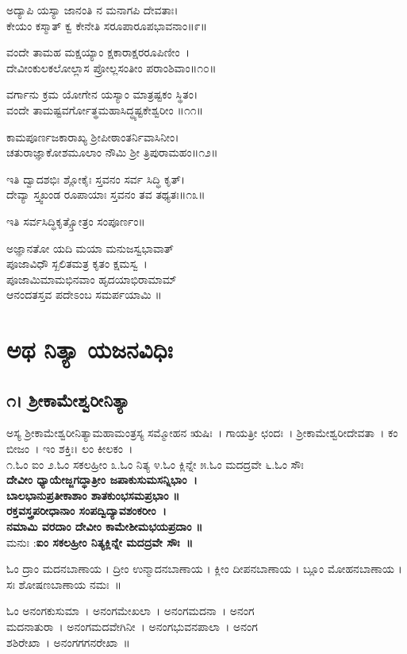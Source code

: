 ಅದ್ಯಾಪಿ ಯಸ್ಯಾ ಜಾನಂತಿ ನ ಮನಾಗಪಿ ದೇವತಾಃ।\\
ಕೇಯಂ ಕಸ್ಮಾತ್ ಕ್ವ ಕೇನೇತಿ ಸರೂಪಾರೂಪಭಾವನಾಂ॥೯॥

ವಂದೇ ತಾಮಹ ಮಕ್ಷಯ್ಯಾಂ ಕ್ಷಕಾರಾಕ್ಷರರೂಪಿಣೀಂ~।\\
ದೇವೀಂಕುಲಕಲೋಲ್ಲಾಸ ಪ್ರೋಲ್ಲಸಂತೀಂ ಪರಾಂಶಿವಾಂ॥೧೦॥

ವರ್ಗಾನು ಕ್ರಮ ಯೋಗೇನ ಯಸ್ಯಾಂ ಮಾತ್ರಷ್ಟಕಂ ಸ್ಥಿತಂ।\\
ವಂದೇ ತಾಮಷ್ಟವರ್ಗೋತ್ಥಮಹಾಸಿದ್ಧ್ಯಷ್ಟಕೇಶ್ವರೀಂ ॥೧೧॥

ಕಾಮಪೂರ್ಣಜಕಾರಾಖ್ಯ ಶ್ರೀಪೀಠಾಂತರ್ನಿವಾಸಿನೀಂ।\\
ಚತುರಾಜ್ಞಾಕೋಶಮೂಲಾಂ ನೌಮಿ ಶ್ರೀ ತ್ರಿಪುರಾಮಹಂ॥೧೨॥

ಇತಿ ದ್ವಾದಶಭಿಃ ಶ್ಲೋಕೈಃ ಸ್ತವನಂ ಸರ್ವ ಸಿದ್ಧಿ ಕೃತ್।\\
ದೇವ್ಯಾ ಸ್ತ್ವಖಂಡ ರೂಪಾಯಾಃ ಸ್ತವನಂ ತವ ತಥ್ಯತಃ॥೧೩॥
\begin{center}{\Large ಇತಿ ಸರ್ವಸಿದ್ಧಿಕೃತ್ಸ್ತೋತ್ರಂ ಸಂಪೂರ್ಣಂ॥}\end{center}
ಅಜ್ಞಾನತೋ ಯದಿ ಮಯಾ ಮನುಜಸ್ವಭಾವಾತ್\\ ಪೂಜಾವಿಧೌ ಸ್ಖಲಿತಮತ್ರ ಕೃತಂ ಕ್ಷಮಸ್ವ~।\\
ಪೂಜಾಮಿಮಾಮಭಿನವಾಂ ಹೃದಯಾಭಿರಾಮಾಮ್ \\ಆನಂದತಸ್ತವ ಪದೇಽಂಬ ಸಮರ್ಪಯಾಮಿ ॥
\chapter*{\center ಅಥ ನಿತ್ಯಾ ಯಜನವಿಧಿಃ}
\thispagestyle{empty}
\section{೧। ಶ್ರೀಕಾಮೇಶ್ವರೀನಿತ್ಯಾ}
ಅಸ್ಯ ಶ್ರೀಕಾಮೇಶ್ವರೀನಿತ್ಯಾಮಹಾಮಂತ್ರಸ್ಯ ಸಮ್ಮೋಹನ ಋಷಿಃ~। ಗಾಯತ್ರೀ ಛಂದಃ~। ಶ್ರೀಕಾಮೇಶ್ವರೀದೇವತಾ~। ಕಂ ಬೀಜಂ~। ಇಂ ಶಕ್ತಿಃ। ಲಂ ಕೀಲಕಂ~।\\
೧.ಓಂ ಐಂ ೨.ಓಂ ಸಕಲಹ್ರೀಂ ೩.ಓಂ ನಿತ್ಯ ೪.ಓಂ ಕ್ಲಿನ್ನೇ ೫.ಓಂ ಮದದ್ರವೇ ೬.ಓಂ ಸೌಃ \\
{\bfseries ದೇವೀಂ ಧ್ಯಾಯೇಜ್ಜಗದ್ಧಾತ್ರೀಂ ಜಪಾಕುಸುಮಸನ್ನಿಭಾಂ~।\\
ಬಾಲಭಾನುಪ್ರತೀಕಾಶಾಂ ಶಾತಕುಂಭಸಮಪ್ರಭಾಂ ॥\\
ರಕ್ತವಸ್ತ್ರಪರೀಧಾನಾಂ ಸಂಪದ್ವಿದ್ಯಾವಶಂಕರೀಂ~।\\
ನಮಾಮಿ ವರದಾಂ ದೇವೀಂ ಕಾಮೇಶೀಮಭಯಪ್ರದಾಂ ॥\\}
ಮನುಃ :{\bfseries ಐಂ ಸಕಲಹ್ರೀಂ ನಿತ್ಯಕ್ಲಿನ್ನೇ ಮದದ್ರವೇ ಸೌಃ~॥}

ಓಂ ದ್ರಾಂ ಮದನಬಾಣಾಯ । ದ್ರೀಂ ಉನ್ಮಾದನಬಾಣಾಯ । ಕ್ಲೀಂ ದೀಪನಬಾಣಾಯ । ಬ್ಲೂಂ ಮೋಹನಬಾಣಾಯ । ಸಃ ಶೋಷಣಬಾಣಾಯ ನಮಃ~॥

ಓಂ ಅನಂಗಕುಸುಮಾ~। ಅನಂಗಮೇಖಲಾ~। ಅನಂಗಮದನಾ~। ಅನಂಗ\\ಮದನಾತುರಾ~। ಅನಂಗಮದವೇಗಿನೀ~। ಅನಂಗಭುವನಪಾಲಾ~। ಅನಂಗ\\ಶಶಿರೇಖಾ~। ಅನಂಗಗಗನರೇಖಾ~॥ 

